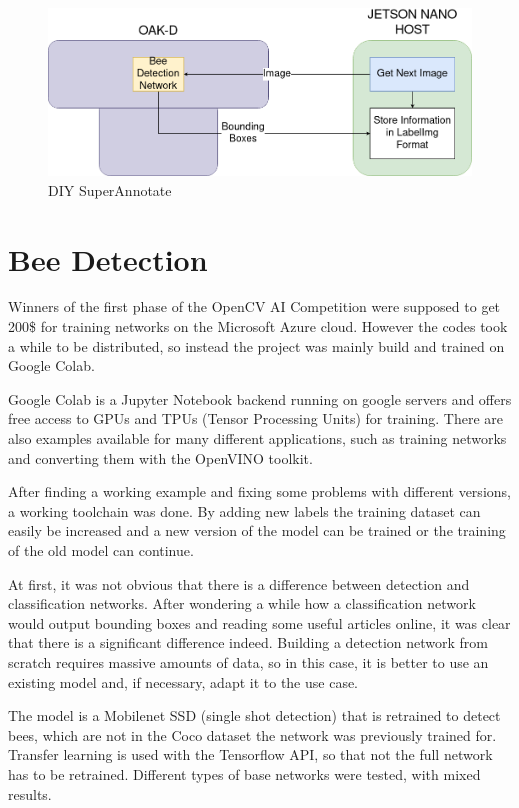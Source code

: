 \documentclass[a4paper,titlepage]{article}
\begin{document}
\begin{figure}[H]
    \includegraphics[width=\textwidth]{TGMB_SuperAnnotate.png}
    \caption{DIY SuperAnnotate}
\end{figure}

\newpage
\section{Bee Detection}

Winners of the first phase of the OpenCV AI Competition were supposed to get 200\$ for training networks on the Microsoft Azure cloud.
However the codes took a while to be distributed, so instead the project was mainly build and trained on Google Colab.

Google Colab is a Jupyter Notebook backend running on google servers and offers free access to GPUs and TPUs (Tensor Processing Units) for training.
There are also examples available for many different applications, such as training networks and converting them with the OpenVINO toolkit.

After finding a working example and fixing some problems with different versions, a working toolchain was done.
By adding new labels the training dataset can easily be increased and a new version of the model can be trained or the training of the old model can continue.

At first, it was not obvious that there is a difference between detection and classification networks.
After wondering a while how a classification network would output bounding boxes and reading some useful articles online, it was clear that there is a significant difference indeed.
Building a detection network from scratch requires massive amounts of data, so in this case, it is better to use an existing model and, if necessary, adapt it to the use case.

The model is a Mobilenet SSD (single shot detection) that is retrained to detect bees, which are not in the Coco dataset the network was previously trained for.
Transfer learning is used with the Tensorflow API, so that not the full network has to be retrained.
Different types of base networks were tested, with mixed results.
\end{document}
